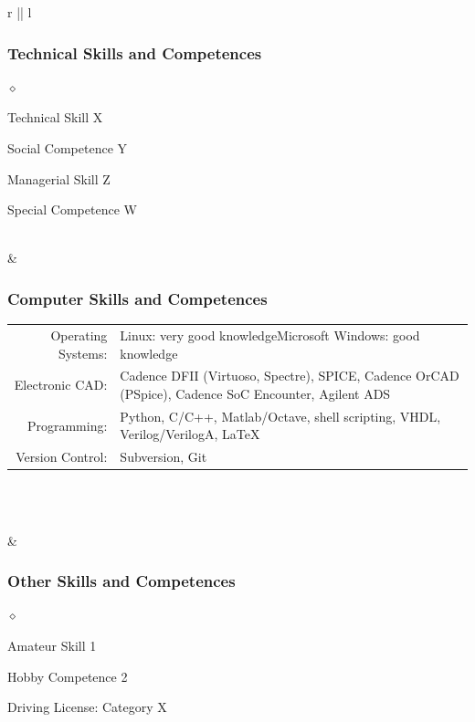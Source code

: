 \documentclass[a4paper]{article}
\newlength{\sectsep}
\newlength{\subsectsep}
\renewenvironment{itemize}{
  \begin{list}{$\diamond$}{
    \setlength{\topsep}{0.25em}
    \setlength{\itemsep}{0em}
    \setlength{\parskip}{0pt}
    \setlength{\parsep}{0em}
  }
}{
  \end{list}
}
\begin{document}
\begin{longtable}{r || l}
\begin{minipage}{0.9\textwidth}
      \subsubsection*{Technical Skills and Competences}
      \begin{itemize}
          \item Technical Skill X
          \item Social Competence Y
          \item Managerial Skill Z
          \item Special Competence W
      \end{itemize}
  \end{minipage} \\[\sectsep]

  & \begin{minipage}{0.9\textwidth}
      \vspace{\subsectsep}
      \subsubsection*{Computer Skills and Competences}
      \begin{tabular*}{\textwidth}{r p{}}
        Operating Systems:&{Linux: very good knowledge\newline Microsoft Windows: good knowledge}\\[0.5ex]
        Electronic CAD:&Cadence DFII (Virtuoso, Spectre), SPICE, Cadence OrCAD (PSpice), Cadence SoC Encounter, Agilent ADS\\[0.5ex]
        Programming:&Python, C/C++, Matlab/Octave, shell scripting, VHDL, Verilog/VerilogA, {\fontfamily{cmr}\selectfont\LaTeX}\\[0.5ex]
        Version Control:&Subversion, Git
      \end{tabular*}\\
  \end{minipage} \\[\sectsep]

  & \begin{minipage}{0.9\textwidth}
      \vspace{\subsectsep}
      \subsubsection*{Other Skills and Competences}
      \begin{itemize}
          \item Amateur Skill 1
          \item Hobby Competence 2
          \item Driving License: Category X
      \end{itemize}
  \end{minipage} \\[\sectsep]


\end{longtable}
\end{document}
